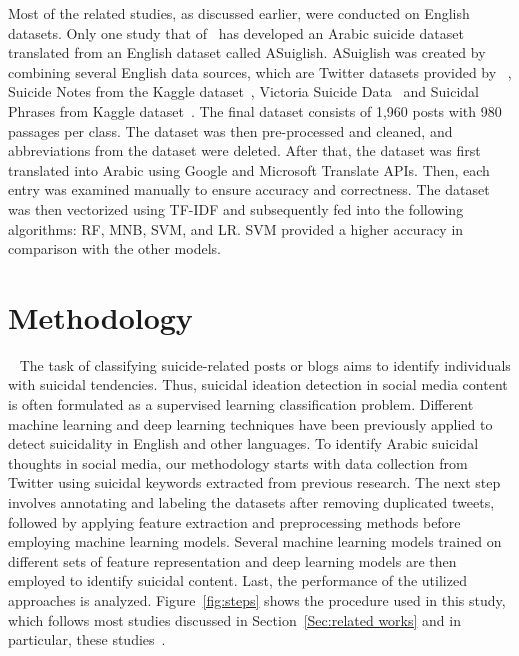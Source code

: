 \documentclass[sn-mathphys,Numbered]{sn-jnl}%
\begin{document}
Most of the related studies, as discussed earlier, were conducted on English datasets. Only one study that of~\citet{9966481} has developed an Arabic suicide dataset translated from an English dataset called ASuiglish. ASuiglish was created by combining several English data sources, which are Twitter datasets provided by ~\cite{10.1093/comjnl/bxab060}, Suicide Notes from the Kaggle dataset~\cite{mashaly_2020}, Victoria Suicide Data~\cite{mashaly_2020} and Suicidal Phrases from Kaggle dataset~\cite{sonu_2020}. The final dataset consists of 1,960 posts with 980 passages per class. The dataset was then pre-processed and cleaned, and abbreviations from the dataset were deleted. After that, the dataset was first translated into Arabic using Google and Microsoft Translate APIs. Then, each entry was examined manually to ensure accuracy and correctness. The dataset was then vectorized using TF-IDF and subsequently fed into the following algorithms: RF, MNB, SVM, and LR. SVM provided a higher accuracy in comparison with the other models. %


\section{Methodology}
~\label{Sec:Methodology} 
The task of classifying suicide-related posts or blogs aims to identify individuals with suicidal tendencies. Thus, suicidal ideation detection in social media content is often formulated as a supervised learning classification problem. Different machine learning and deep learning techniques have been previously applied to detect suicidality in English and other languages. To identify Arabic suicidal thoughts in social media, our methodology starts with data collection from Twitter using suicidal keywords extracted from previous research. The next step involves annotating and labeling the datasets after removing duplicated tweets, followed by applying feature extraction and preprocessing methods before employing machine learning models. Several machine learning models trained on different sets of feature representation and deep learning models are then employed to identify suicidal content. Last, the performance of the utilized approaches is analyzed.
Figure~\ref{fig:steps} shows the procedure used in this study, which follows most studies discussed in Section~\ref{Sec:related works} 
 and in particular, these studies~\cite{9ji2018supervised,1astoveza2018suicidal,word2ODEA2015183}.
\end{document}
